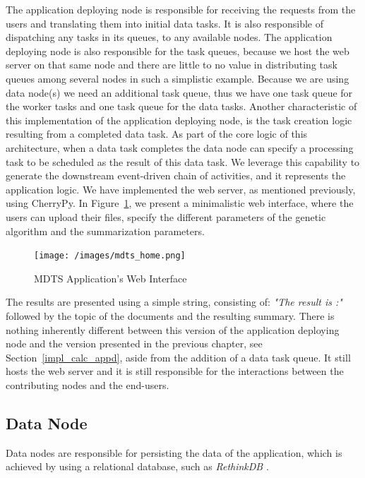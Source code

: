 \documentclass[12pt, titlepage]{uo_temp}
\begin{document}
     The application deploying node is responsible for receiving the requests from the
     users and translating them into initial data tasks. It is also responsible of
     dispatching any tasks in its queues, to any available nodes. 
     The application deploying node is also responsible for the task queues, because we host
     the web server on that same node and there are little to no value in distributing
     task queues among several nodes in such a simplistic example. Because we are
     using data node(s) we need an additional task queue, thus we have one task queue for the
     worker tasks and one task queue for the data tasks.
     Another characteristic of this implementation of the application deploying node, is
     the task creation logic resulting from a completed data task. As part of the core
     logic of this architecture, when a data task completes the data node can specify a
     processing task to be scheduled as the result of this data task. We leverage this
     capability to generate the downstream event-driven chain of activities, and it
     represents the application logic.
     We have implemented the web server, as mentioned previously, using CherryPy. In
     Figure~\ref{mdts_home}, we present a minimalistic web interface, where the users can
     upload their files, specify the different parameters of the genetic algorithm and the
     summarization parameters.

     \begin{figure}[h]
       \texttt{[image: /images/mdts\_home.png]}
       \caption{MDTS Application's Web Interface}
       \label{mdts_home}
     \end{figure}
     
     The results are presented using a simple string, consisting of: \emph{"The result
       is :"} followed by the topic of the documents and the resulting summary. 
     There is nothing inherently different between this version of the application
     deploying node and the version presented in the previous chapter, see
     Section~\ref{impl_calc_appd}, aside from the addition of a data task queue. It still
     hosts the web server and it is still responsible for the interactions between the
     contributing nodes and the end-users.

     \subsection{Data Node}
     Data nodes are responsible for persisting the data of the application, which is
     achieved by using a relational database, such as \emph{RethinkDB}
     \cite{rethinkdb}.
     
\end{document}
